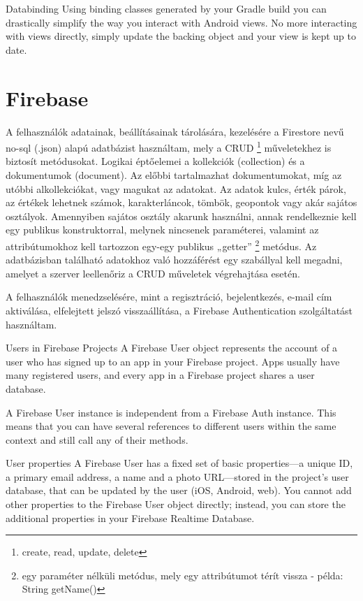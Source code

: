 Databinding
Using binding classes generated by your Gradle build you can drastically simplify the way you interact with Android views. No more interacting with views directly, simply update the backing object and your view is kept up to date.

\section{Firebase}\label{sec:ALAP:szerkeszt}

A felhasználók adatainak, beállításainak tárolására, kezelésére a Firestore nevű no-sql (.json) alapú adatbázist használtam, mely a CRUD%
\footnote{ %
	create, read, update, delete
}  %
 műveletekhez is biztosít metódusokat. Logikai éptőelemei a kollekciók (collection) és a dokumentumok (document). Az előbbi tartalmazhat dokumentumokat, míg az utóbbi alkollekciókat, vagy magukat az adatokat. Az adatok kulcs, érték párok, az értékek lehetnek számok, karakterláncok, tömbök, geopontok vagy akár sajátos osztályok. Amennyiben sajátos osztály akarunk használni, annak rendelkeznie kell egy publikus konstruktorral, melynek nincsenek paraméterei, valamint az attribútumokhoz kell tartozzon egy-egy publikus „getter”%
 \footnote{ %
 	egy paraméter nélküli metódus, mely egy attribútumot térít vissza - példa: String getName()
 }  %
 metódus. Az adatbázisban található adatokhoz való hozzáférést egy szabállyal kell megadni, amelyet a szerver leellenőriz a CRUD műveletek végrehajtása esetén.

A felhasználók menedzselésére, mint a regisztráció, bejelentkezés, e-mail cím aktiválása, elfelejtett jelszó visszaállítása, a Firebase Authentication szolgáltatást használtam.



Users in Firebase Projects
A Firebase User object represents the account of a user who has signed up to an app in your Firebase project. Apps usually have many registered users, and every app in a Firebase project shares a user database.

A Firebase User instance is independent from a Firebase Auth instance. This means that you can have several references to different users within the same context and still call any of their methods.

User properties
A Firebase User has a fixed set of basic properties—a unique ID, a primary email address, a name and a photo URL—stored in the project's user database, that can be updated by the user (iOS, Android, web). You cannot add other properties to the Firebase User object directly; instead, you can store the additional properties in your Firebase Realtime Database.

